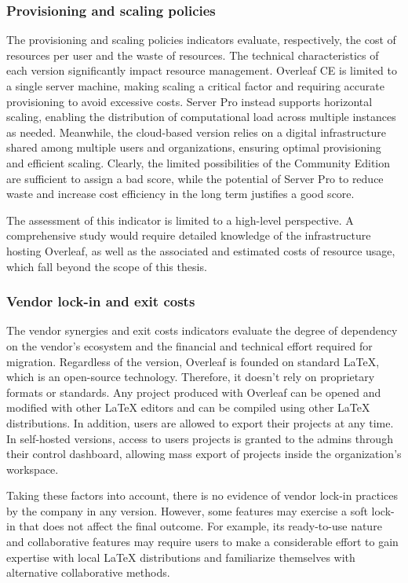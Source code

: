 \subsubsection{Provisioning and scaling policies}
The provisioning and scaling policies indicators evaluate, respectively, the cost of resources per user and the waste of resources. The technical characteristics of each version significantly impact resource management. Overleaf CE is limited to a single server machine, making scaling a critical factor and requiring accurate provisioning to avoid excessive costs. Server Pro instead supports horizontal scaling, enabling the distribution of computational load across multiple instances as needed. Meanwhile, the cloud-based version relies on a digital infrastructure shared among multiple users and organizations, ensuring optimal provisioning and efficient scaling. Clearly, the limited possibilities of the Community Edition are sufficient to assign a bad score, while the potential of Server Pro to reduce waste and increase cost efficiency in the long term justifies a good score. 

The assessment of this indicator is limited to a high-level perspective. A comprehensive study would require detailed knowledge of the infrastructure hosting Overleaf, as well as the associated and estimated costs of resource usage, which fall beyond the scope of this thesis.   

\subsubsection{Vendor lock-in and exit costs}
The vendor synergies and exit costs indicators evaluate the degree of dependency on the vendor’s ecosystem and the financial and technical effort required for migration. Regardless of the version, Overleaf is founded on standard LaTeX, which is an open-source technology. Therefore, it doesn't rely on proprietary formats or standards. Any project produced with Overleaf can be opened and modified with other LaTeX editors and can be compiled using other LaTeX distributions. In addition, users are allowed to export their projects at any time. In self-hosted versions, access to users projects is granted to the admins through their control dashboard, allowing mass export of projects inside the organization's workspace. 

Taking these factors into account, there is no evidence of vendor lock-in practices by the company in any version. However, some features may exercise a soft lock-in that does not affect the final outcome. For example, its ready-to-use nature and collaborative features may require users to make a considerable effort to gain expertise with local LaTeX distributions and familiarize themselves with alternative collaborative methods.


